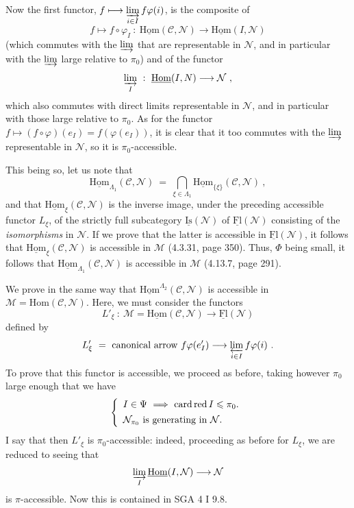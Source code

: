 \documentclass[11pt]{article}
\newcommand{\printedpage}[1]{\marginpar{\footnotesize p.~#1}}
\newcommand{\msp}[1]{\marginpar{\footnotesize [#1]}}
\newcommand{\uHom}{\underline{\mathrm{Hom}}}
\newcommand{\uFl}{\underline{\mathrm{Fl}}}
\newcommand{\uIs}{\underline{\mathrm{Is}}}
\newcommand{\cardred}{\mathop{\textup{card\,red}}}
\begin{document}
\msp{page 382}
Now the first functor, $f \longmapsto \varinjlim\limits_{i\in I} f\varphi(i)$, is the composite of
\[
f \longmapsto f\circ\varphi_I \ : \ \uHom(\mathcal{C},\mathcal{N}) \longrightarrow \uHom(I,\mathcal{N})
\]
(which commutes with the $\varinjlim$ that are representable in $\mathcal{N}$, and in particular with the $\varinjlim$ large relative to $\pi_0$) and of the functor
\[
\varinjlim_{I} \ : \ \uHom(I,N) \longrightarrow \mathcal{N} \ , %
\]
which also commutes with direct limits representable in $\mathcal{N}$, and in particular with those large relative to $\pi_0$. As for the functor $f \longmapsto (f\circ\varphi)(e_I) = f(\varphi(e_I))$, it is clear that it too commutes with the $\varinjlim$ representable in $\mathcal{N}$, so it is $\pi_0$-accessible.

\printedpage{145}

This being so, let us note that
\[
\uHom_{\Lambda_1}(\mathcal{C},\mathcal{N}) \ = \ \bigcap_{\xi\in\Lambda_1} \uHom_{\{\xi\}}(\mathcal{C},\mathcal{N}) \ ,
\]
and that $\uHom_\xi(\mathcal{C},\mathcal{N})$ is the inverse image, under the preceding accessible functor $L_\xi$, of the strictly full subcategory $\uIs(\mathcal{N})$ of $\uFl(\mathcal{N})$ consisting of the \textit{isomorphisms} in $\mathcal{N}$. If we prove that the latter is accessible in $\uFl(\mathcal{N})$, it follows that
\msp{page 383}
$\uHom_\xi(\mathcal{C},\mathcal{N})$ is accessible in $\mathcal{M}$ (4.3.31, page 350). Thus, $\Phi$ being small, it follows that $\uHom_{\Lambda_1}(\mathcal{C},\mathcal{N})$ is accessible in $\mathcal{M}$ (4.13.7, page 291).

We prove in the same way that $\uHom^{\Lambda_2}(\mathcal{C},\mathcal{N})$ is accessible in $\mathcal{M} = \mathrm{Hom}(\mathcal{C},\mathcal{N})$. Here, we must consider the functors %
\[
L'_\xi \ : \ \mathcal{M} = \uHom(\mathcal{C},\mathcal{N}) \longrightarrow \uFl(\mathcal{N})
\]
defined by
\[
L'_\xi \ = \ \text{canonical arrow } f\varphi(e'_I) \longrightarrow \varprojlim_{i\in I} f\varphi(i) \ .
\]
To prove that this functor is accessible, we proceed as before, taking however $\pi_0$ large enough that we have
\[
\left\{
\begin{array}{l}
I \in \Psi \ \Longrightarrow \ \cardred I \leqslant \pi_0. \\[1ex]
\mathcal{N}_{\pi_0} \text{ is generating in } \mathcal{N}.
\end{array}
\right.
\]
I say that then $L'_\xi$ is $\pi_0$-accessible: indeed, proceeding as before for $L_\xi$, we are reduced to seeing that
\[
\varinjlim_{I} \uHom(I,\mathcal{N}) \longrightarrow \mathcal{N}
\]
is $\pi$-accessible. Now this is contained in SGA 4 I 9.8.
\end{document}
